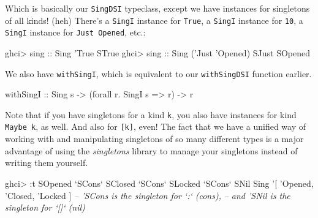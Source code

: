 \documentclass[]{article}
\newenvironment{Shaded}{}{}
\newcommand{\DataTypeTok}[1]{\textcolor[rgb]{0.56,0.13,0.00}{#1}}
\newcommand{\CharTok}[1]{\textcolor[rgb]{0.25,0.44,0.63}{#1}}
\newcommand{\CommentTok}[1]{\textcolor[rgb]{0.38,0.63,0.69}{\textit{#1}}}
\newcommand{\OtherTok}[1]{\textcolor[rgb]{0.00,0.44,0.13}{#1}}
\newcommand{\FunctionTok}[1]{\textcolor[rgb]{0.02,0.16,0.49}{#1}}
\newcommand{\NormalTok}[1]{#1}
\begin{document}
Which is basically our \texttt{SingDSI} typeclass, except we have instances for
singletons of all kinds! (heh) There's a \texttt{SingI} instance for
\texttt{\textquotesingle{}True}, a \texttt{SingI} instance for \texttt{10}, a
\texttt{SingI} instance for
\texttt{\textquotesingle{}Just\ \textquotesingle{}Opened}, etc.:

\begin{Shaded}
\begin{Highlighting}[]
\NormalTok{ghci}\FunctionTok{>}\OtherTok{ sing ::} \DataTypeTok{Sing} \CharTok{'True}
\DataTypeTok{STrue}
\NormalTok{ghci}\FunctionTok{>}\OtherTok{ sing ::} \DataTypeTok{Sing}\NormalTok{ (}\CharTok{'Just '}\DataTypeTok{Opened}\NormalTok{)}
\DataTypeTok{SJust} \DataTypeTok{SOpened}
\end{Highlighting}
\end{Shaded}

We also have \texttt{withSingI}, which is equivalent to our \texttt{withSingDSI}
function earlier.

\begin{Shaded}
\begin{Highlighting}[]
\OtherTok{withSingI ::} \DataTypeTok{Sing}\NormalTok{ s }\OtherTok{->}\NormalTok{ (forall r}\FunctionTok{.} \DataTypeTok{SingI}\NormalTok{ s }\OtherTok{=>}\NormalTok{ r) }\OtherTok{->}\NormalTok{ r}
\end{Highlighting}
\end{Shaded}

Note that if you have singletons for a kind \texttt{k}, you also have instances
for kind \texttt{Maybe\ k}, as well. And also for \texttt{{[}k{]}}, even! The
fact that we have a unified way of working with and manipulating singletons of
so many different types is a major advantage of using the \emph{singletons}
library to manage your singletons instead of writing them yourself.

\begin{Shaded}
\begin{Highlighting}[]
\NormalTok{ghci}\FunctionTok{>} \FunctionTok{:}\NormalTok{t }\DataTypeTok{SOpened} \OtherTok{`SCons`} \DataTypeTok{SClosed} \OtherTok{`SCons`} \DataTypeTok{SLocked} \OtherTok{`SCons`} \DataTypeTok{SNil}
\DataTypeTok{Sing} \CharTok{'[ '}\DataTypeTok{Opened}\NormalTok{, }\CharTok{'Closed, '}\DataTypeTok{Locked}\NormalTok{ ]}
\CommentTok{-- 'SCons is the singleton for `:` (cons),}
\CommentTok{-- and 'SNil is the singleton for `[]` (nil)}
\end{Highlighting}
\end{Shaded}
\end{document}
